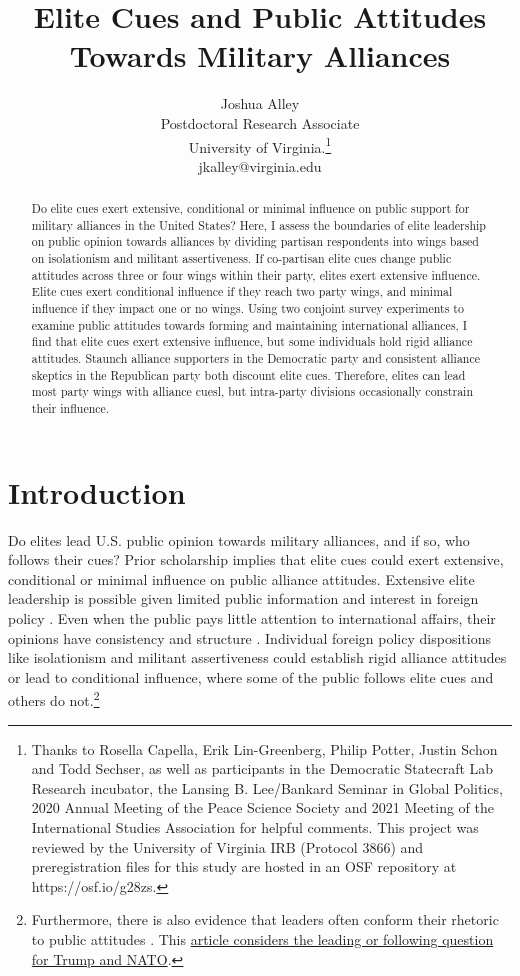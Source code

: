\documentclass[12pt]{article}
\title{\textbf{Elite Cues and Public Attitudes Towards Military Alliances}}
\author{Joshua Alley \\
Postdoctoral Research Associate \\
University of Virginia.\thanks{Thanks to Rosella Capella, Erik Lin-Greenberg, Philip Potter, Justin Schon and Todd Sechser, as well as participants in the Democratic Statecraft Lab Research incubator, the Lansing B. Lee/Bankard Seminar in Global Politics, 2020 Annual Meeting of the Peace Science Society and 2021 Meeting of the International Studies Association for helpful comments. 
This project was reviewed by the University of Virginia IRB (Protocol 3866) and preregistration files for this study are hosted in an OSF repository at https://osf.io/g28zs.} \\
jkalley@virginia.edu
}
\date{}
\begin{document}
\maketitle 

\doublespace 

\begin{abstract}
Do elite cues exert extensive, conditional or minimal influence on public support for military alliances in the United States? 
Here, I assess the boundaries of elite leadership on public opinion towards alliances by dividing partisan respondents into wings based on isolationism and militant assertiveness.
If co-partisan elite cues change public attitudes across three or four wings within their party, elites exert extensive influence. 
Elite cues exert conditional influence if they reach two party wings, and minimal influence if they impact one or no wings.
Using two conjoint survey experiments to examine public attitudes towards forming and maintaining international alliances, I find that elite cues exert extensive influence, but some individuals hold rigid alliance attitudes. 
Staunch alliance supporters in the Democratic party and consistent alliance skeptics in the Republican party both discount elite cues.  
Therefore, elites can lead most party wings with alliance cuesl, but intra-party divisions occasionally constrain their influence.  
\end{abstract}


\newpage 


\section{Introduction}


Do elites lead U.S. public opinion towards military alliances, and if so, who follows their cues?
Prior scholarship implies that elite cues could exert extensive, conditional or minimal influence on public alliance attitudes.
Extensive elite leadership is possible given limited public information and interest in foreign policy \citep{Canes-Wrone2006, BaumPotter2008, Druckman2014}.
Even when the public pays little attention to international affairs, their opinions have consistency and structure \citep{Holsti1992, PageShapiro1992}.
Individual foreign policy dispositions like isolationism and militant assertiveness \citep{Herrmannetal1999, KertzerZeitzoff2017} could establish rigid alliance attitudes or lead to conditional influence, where some of the public follows elite cues and others do not.\footnote{Furthermore, there is also evidence that leaders often conform their rhetoric to public attitudes \citep{Barberaetal2019, HagerHilbig2020}. This \href{https://fivethirtyeight.com/features/is-trump-fueling-republicans-concerns-about-nato-or-echoing-them/}{article considers the leading or following question for Trump and NATO}.}
\end{document}
